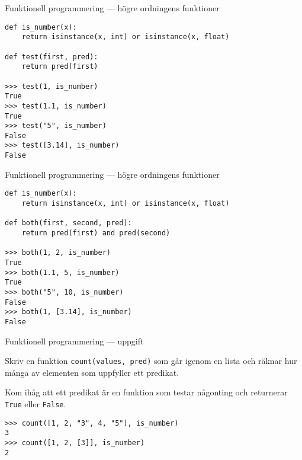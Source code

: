 \documentclass{beamer}
\begin{document}
  \begin{frame}[fragile]{Funktionell programmering --- högre ordningens funktioner}

    \begin{lstlisting}
def is_number(x):
    return isinstance(x, int) or isinstance(x, float)

def test(first, pred):
    return pred(first)

>>> test(1, is_number)
True
>>> test(1.1, is_number)
True
>>> test("5", is_number)
False
>>> test([3.14], is_number)
False
    \end{lstlisting}

  \end{frame}

  \begin{frame}[fragile]{Funktionell programmering --- högre ordningens funktioner}

    \begin{lstlisting}
def is_number(x):
    return isinstance(x, int) or isinstance(x, float)

def both(first, second, pred):
    return pred(first) and pred(second)

>>> both(1, 2, is_number)
True
>>> both(1.1, 5, is_number)
True
>>> both("5", 10, is_number)
False
>>> both(1, [3.14], is_number)
False
    \end{lstlisting}

  \end{frame}

  \begin{frame}[fragile]{Funktionell programmering --- uppgift}

    Skriv en funktion \texttt{count(values, pred)} som går igenom en lista och
    räknar hur många av elementen som uppfyller ett predikat.

    \pause{}

    Kom ihåg att ett predikat är en funktion som testar någonting och
    returnerar \texttt{True} eller \texttt{False}.

    \pause{}

    \begin{lstlisting}
>>> count([1, 2, "3", 4, "5"], is_number)
3
>>> count([1, 2, [3]], is_number)
2
    \end{lstlisting}

    \pause{}


  \end{frame}
\end{document}
